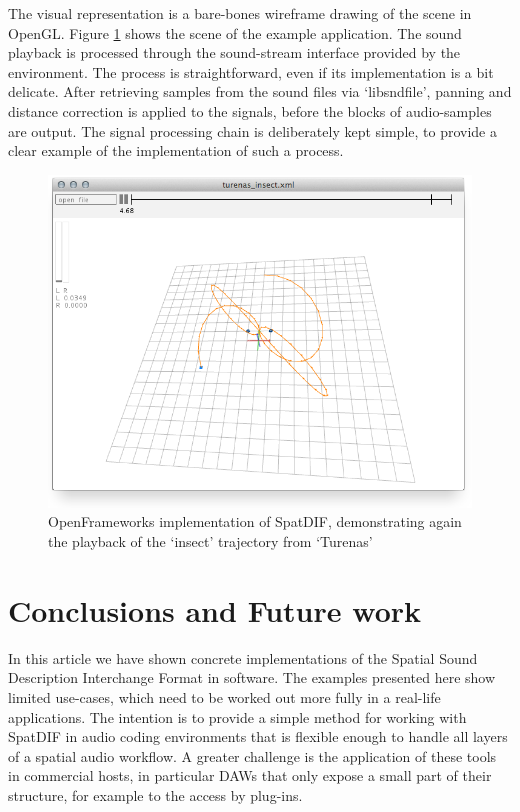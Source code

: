 \documentclass{article}
\begin{document}
The visual representation is a bare-bones wireframe drawing of the scene in OpenGL.
Figure \ref{fig:screenshot3} shows the scene of the example application.
The sound playback is processed through the sound-stream interface provided by the environment.
The process is straightforward, even if its implementation is a bit delicate.
After retrieving samples from the sound files via `libsndfile', panning and distance correction is applied to the signals, before the blocks of audio-samples are output.
The signal processing chain is deliberately kept simple, to provide a clear example of the implementation of such a process.


\begin{figure}[httb]
	\centering
	\includegraphics[width=\columnwidth]{of_screenshot.png}
	\caption{OpenFrameworks implementation of SpatDIF, demonstrating again the playback of the `insect' trajectory from `Turenas'} 
	\label{fig:screenshot3}
\end{figure}


\section{Conclusions and Future work}\label{sec:conclusions_future_work}

In this article we have shown concrete implementations of the Spatial Sound Description Interchange Format in software.
The examples presented here show limited use-cases, which need to be worked out more fully in a real-life applications.
The intention is to provide a simple method for working with SpatDIF in audio coding environments that is flexible enough to handle all layers of a spatial audio workflow. \cite{PetersSMC09}
A greater challenge is the application of these tools in commercial hosts, in particular DAWs that only expose a small part of their structure, for example to the access by plug-ins.
\end{document}
